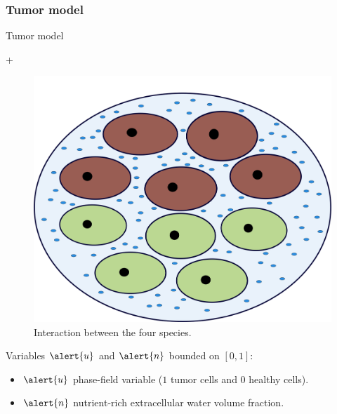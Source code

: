 \subsubsection{Tumor model}
\begin{frame}{Tumor model}
	\begin{block}{}
		\begin{center}
			 \alert{+} 
		\end{center}
	\end{block}
	\begin{figure}[h!]
		\centering
		\includegraphics[scale=0.1]{img/celulas.png}
		\caption{Interaction between the four species.}
	\end{figure}
	Variables $\alert{u}$ and $\alert{n}$ bounded on $[0,1]$:
	\begin{itemize}
		\item $\alert{u}$ phase-field variable ($1$ tumor cells and $0$ healthy cells).
		\item $\alert{n}$ nutrient-rich extracellular water volume fraction.
	\end{itemize}

	
\end{frame}

